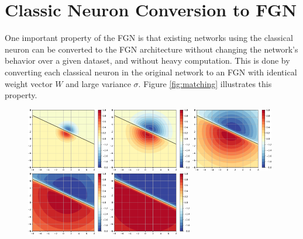\documentclass[12pt,oneside]{CUNY_PhD}
\begin{document}
\section{Classic Neuron Conversion to FGN}
One important property of the FGN is that existing networks using the classical neuron can be converted to the FGN architecture without changing the network's behavior over a given dataset, and without heavy computation. This is done by converting each classical neuron in the original network to an FGN with identical weight vector $W$ and large variance $\sigma$. Figure \ref{fig:matching} illustrates this property.
\begin{figure}[!t]
    \centering
    \includegraphics[width=0.32\textwidth]{images/Matching-behavior/sigma-2-cropped.png}
    \includegraphics[width=0.32\textwidth]{images/Matching-behavior/sigma-3-cropped.png}
    \includegraphics[width=0.32\textwidth]{images/Matching-behavior/sigma-4-cropped.png}
    \includegraphics[width=0.32\textwidth]{images/Matching-behavior/sigma-5-cropped.png}
    \includegraphics[width=0.32\textwidth]{images/Matching-behavior/sigma-6-cropped.png}

\end{figure}
\end{document}
